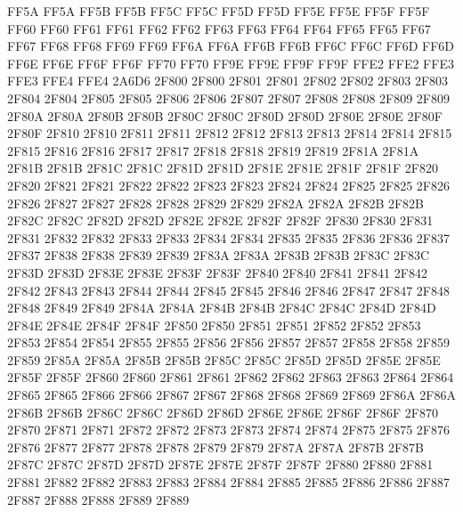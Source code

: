 \ID FF5A FF5A
\OP FF5B FF5B
\ID FF5C FF5C
\CL FF5D FF5D
\ID FF5E FF5E
\OP FF5F FF5F
\CL FF60 FF60
\CL FF61 FF61
\OP FF62 FF62
\CL FF63 FF63
\CL FF64 FF64
\NS FF65 FF65
\NS FF67 FF67
\NS FF68 FF68
\NS FF69 FF69
\NS FF6A FF6A
\NS FF6B FF6B
\NS FF6C FF6C
\NS FF6D FF6D
\NS FF6E FF6E
\NS FF6F FF6F
\NS FF70 FF70
\NS FF9E FF9E
\NS FF9F FF9F
\ID FFE2 FFE2
\ID FFE3 FFE3
\ID FFE4 FFE4
 2A6D6
\ID 2F800 2F800
\ID 2F801 2F801
\ID 2F802 2F802
\ID 2F803 2F803
\ID 2F804 2F804
\ID 2F805 2F805
\ID 2F806 2F806
\ID 2F807 2F807
\ID 2F808 2F808
\ID 2F809 2F809
\ID 2F80A 2F80A
\ID 2F80B 2F80B
\ID 2F80C 2F80C
\ID 2F80D 2F80D
\ID 2F80E 2F80E
\ID 2F80F 2F80F
\ID 2F810 2F810
\ID 2F811 2F811
\ID 2F812 2F812
\ID 2F813 2F813
\ID 2F814 2F814
\ID 2F815 2F815
\ID 2F816 2F816
\ID 2F817 2F817
\ID 2F818 2F818
\ID 2F819 2F819
\ID 2F81A 2F81A
\ID 2F81B 2F81B
\ID 2F81C 2F81C
\ID 2F81D 2F81D
\ID 2F81E 2F81E
\ID 2F81F 2F81F
\ID 2F820 2F820
\ID 2F821 2F821
\ID 2F822 2F822
\ID 2F823 2F823
\ID 2F824 2F824
\ID 2F825 2F825
\ID 2F826 2F826
\ID 2F827 2F827
\ID 2F828 2F828
\ID 2F829 2F829
\ID 2F82A 2F82A
\ID 2F82B 2F82B
\ID 2F82C 2F82C
\ID 2F82D 2F82D
\ID 2F82E 2F82E
\ID 2F82F 2F82F
\ID 2F830 2F830
\ID 2F831 2F831
\ID 2F832 2F832
\ID 2F833 2F833
\ID 2F834 2F834
\ID 2F835 2F835
\ID 2F836 2F836
\ID 2F837 2F837
\ID 2F838 2F838
\ID 2F839 2F839
\ID 2F83A 2F83A
\ID 2F83B 2F83B
\ID 2F83C 2F83C
\ID 2F83D 2F83D
\ID 2F83E 2F83E
\ID 2F83F 2F83F
\ID 2F840 2F840
\ID 2F841 2F841
\ID 2F842 2F842
\ID 2F843 2F843
\ID 2F844 2F844
\ID 2F845 2F845
\ID 2F846 2F846
\ID 2F847 2F847
\ID 2F848 2F848
\ID 2F849 2F849
\ID 2F84A 2F84A
\ID 2F84B 2F84B
\ID 2F84C 2F84C
\ID 2F84D 2F84D
\ID 2F84E 2F84E
\ID 2F84F 2F84F
\ID 2F850 2F850
\ID 2F851 2F851
\ID 2F852 2F852
\ID 2F853 2F853
\ID 2F854 2F854
\ID 2F855 2F855
\ID 2F856 2F856
\ID 2F857 2F857
\ID 2F858 2F858
\ID 2F859 2F859
\ID 2F85A 2F85A
\ID 2F85B 2F85B
\ID 2F85C 2F85C
\ID 2F85D 2F85D
\ID 2F85E 2F85E
\ID 2F85F 2F85F
\ID 2F860 2F860
\ID 2F861 2F861
\ID 2F862 2F862
\ID 2F863 2F863
\ID 2F864 2F864
\ID 2F865 2F865
\ID 2F866 2F866
\ID 2F867 2F867
\ID 2F868 2F868
\ID 2F869 2F869
\ID 2F86A 2F86A
\ID 2F86B 2F86B
\ID 2F86C 2F86C
\ID 2F86D 2F86D
\ID 2F86E 2F86E
\ID 2F86F 2F86F
\ID 2F870 2F870
\ID 2F871 2F871
\ID 2F872 2F872
\ID 2F873 2F873
\ID 2F874 2F874
\ID 2F875 2F875
\ID 2F876 2F876
\ID 2F877 2F877
\ID 2F878 2F878
\ID 2F879 2F879
\ID 2F87A 2F87A
\ID 2F87B 2F87B
\ID 2F87C 2F87C
\ID 2F87D 2F87D
\ID 2F87E 2F87E
\ID 2F87F 2F87F
\ID 2F880 2F880
\ID 2F881 2F881
\ID 2F882 2F882
\ID 2F883 2F883
\ID 2F884 2F884
\ID 2F885 2F885
\ID 2F886 2F886
\ID 2F887 2F887
\ID 2F888 2F888
\ID 2F889 2F889
